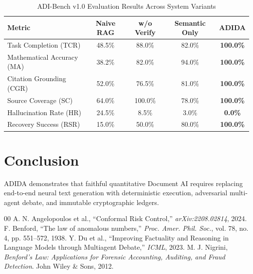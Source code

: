 \documentclass[10pt,journal,compsoc]{IEEEtran}
\begin{document}
\begin{table}[htbp]
\caption{ADI-Bench v1.0 Evaluation Results Across System Variants}
\label{tab:benchmarks}
\centering
\begin{tabular}{lcccc}
\toprule
\textbf{Metric} & \textbf{Naive RAG} & \textbf{w/o Verify} & \textbf{Semantic Only} & \textbf{ADIDA} \\
\midrule
Task Completion (TCR) & 48.5\% & 88.0\% & 82.0\% & \textbf{100.0\%} \\
Mathematical Accuracy (MA) & 38.2\% & 82.0\% & 94.0\% & \textbf{100.0\%} \\
Citation Grounding (CGR) & 52.0\% & 76.5\% & 81.0\% & \textbf{100.0\%} \\
Source Coverage (SC) & 64.0\% & 100.0\% & 78.0\% & \textbf{100.0\%} \\
Hallucination Rate (HR) & 24.5\% & 8.5\% & 3.0\% & \textbf{0.0\%} \\
Recovery Success (RSR) & 15.0\% & 50.0\% & 80.0\% & \textbf{100.0\%} \\
\bottomrule
\end{tabular}
\end{table}

\section{Conclusion}
ADIDA demonstrates that faithful quantitative Document AI requires replacing end-to-end neural text generation with deterministic execution, adversarial multi-agent debate, and immutable cryptographic ledgers.

\begin{thebibliography}{00}
 A. N. Angelopoulos et al., ``Conformal Risk Control,'' \emph{arXiv:2208.02814}, 2024.
 F. Benford, ``The law of anomalous numbers,'' \emph{Proc. Amer. Phil. Soc.}, vol. 78, no. 4, pp. 551--572, 1938.
 Y. Du et al., ``Improving Factuality and Reasoning in Language Models through Multiagent Debate,'' \emph{ICML}, 2023.
 M. J. Nigrini, \emph{Benford's Law: Applications for Forensic Accounting, Auditing, and Fraud Detection}. John Wiley \& Sons, 2012.
\end{thebibliography}
\end{document}
